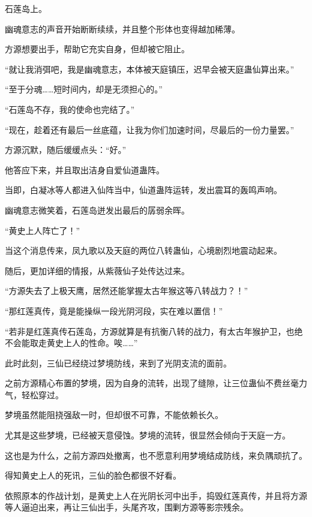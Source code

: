 
\begin{this_body}



石莲岛上。

幽魂意志的声音开始断断续续，并且整个形体也变得越加稀薄。

方源想要出手，帮助它充实自身，但却被它阻止。

“就让我消弭吧，我是幽魂意志，本体被天庭镇压，迟早会被天庭蛊仙算出来。”

“至于分魂……短时间内，却是无须担心的。”

“石莲岛不存，我的使命也完结了。”

“现在，趁着还有最后一丝底蕴，让我为你们加速时间，尽最后的一份力量罢。”

方源沉默，随后缓缓点头：“好。”

他答应下来，并且取出洁身自爱仙道蛊阵。

当即，白凝冰等人都进入仙阵当中，仙道蛊阵运转，发出震耳的轰鸣声响。

幽魂意志微笑着，石莲岛迸发出最后的孱弱余晖。

“黄史上人阵亡了！”

当这个消息传来，凤九歌以及天庭的两位八转蛊仙，心境剧烈地震动起来。

随后，更加详细的情报，从紫薇仙子处传达过来。

“方源失去了上极天鹰，居然还能掌握太古年猴这等八转战力？！”

“那红莲真传，竟是能操纵一段光阴河段，实在难以置信！”

“若非是红莲真传石莲岛，方源就算是有抗衡八转的战力，有太古年猴护卫，也绝不会能取走黄史上人的性命。唉……”

此时此刻，三仙已经绕过梦境防线，来到了光阴支流的面前。

之前方源精心布置的梦境，因为自身的流转，出现了缝隙，让三位蛊仙不费丝毫力气，轻松穿过。

梦境虽然能阻挠强敌一时，但却很不可靠，不能依赖长久。

尤其是这些梦境，已经被天意侵蚀。梦境的流转，很显然会倾向于天庭一方。

这也是为什么，之前方源四处撤离，也不愿意利用梦境结成防线，来负隅顽抗了。

得知黄史上人的死讯，三仙的脸色都很不好看。

依照原本的作战计划，是黄史上人在光阴长河中出手，捣毁红莲真传，并且将方源等人逼迫出来，再让三仙出手，头尾齐攻，围剿方源等影宗残余。


\end{this_body}
